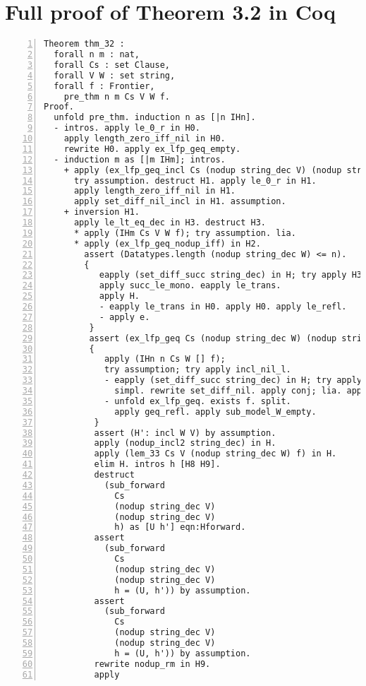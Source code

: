 \chapter{Full proof of Theorem 3.2 in Coq}

\begin{lstlisting}[language=Coq, label={lst:thm_32_full_proof}, caption={Full proof of Theorem 3.2 in Coq}, numbers=left]
Theorem thm_32 :
  forall n m : nat,
  forall Cs : set Clause,
  forall V W : set string,
  forall f : Frontier,
    pre_thm n m Cs V W f.
Proof.
  unfold pre_thm. induction n as [|n IHn].
  - intros. apply le_0_r in H0.
    apply length_zero_iff_nil in H0.
    rewrite H0. apply ex_lfp_geq_empty.
  - induction m as [|m IHm]; intros.
    + apply (ex_lfp_geq_incl Cs (nodup string_dec V) (nodup string_dec W));
      try assumption. destruct H1. apply le_0_r in H1.
      apply length_zero_iff_nil in H1.
      apply set_diff_nil_incl in H1. assumption.
    + inversion H1.
      apply le_lt_eq_dec in H3. destruct H3.
      * apply (IHm Cs V W f); try assumption. lia.
      * apply (ex_lfp_geq_nodup_iff) in H2.
        assert (Datatypes.length (nodup string_dec W) <= n).
        {
           eapply (set_diff_succ string_dec) in H; try apply H3.
           apply succ_le_mono. eapply le_trans.
           apply H.
           - eapply le_trans in H0. apply H0. apply le_refl.
           - apply e.
         }
         assert (ex_lfp_geq Cs (nodup string_dec W) (nodup string_dec W) f).
         {
            apply (IHn n Cs W [] f);
            try assumption; try apply incl_nil_l.
            - eapply (set_diff_succ string_dec) in H; try apply H3.
              simpl. rewrite set_diff_nil. apply conj; lia. apply e.
            - unfold ex_lfp_geq. exists f. split.
              apply geq_refl. apply sub_model_W_empty.
          }
          assert (H': incl W V) by assumption.
          apply (nodup_incl2 string_dec) in H.
          apply (lem_33 Cs V (nodup string_dec W) f) in H.
          elim H. intros h [H8 H9].
          destruct
            (sub_forward
              Cs
              (nodup string_dec V)
              (nodup string_dec V)
              h) as [U h'] eqn:Hforward.
          assert
            (sub_forward
              Cs
              (nodup string_dec V)
              (nodup string_dec V)
              h = (U, h')) by assumption.
          assert
            (sub_forward
              Cs
              (nodup string_dec V)
              (nodup string_dec V)
              h = (U, h')) by assumption.
          rewrite nodup_rm in H9.
          apply

\end{lstlisting}
